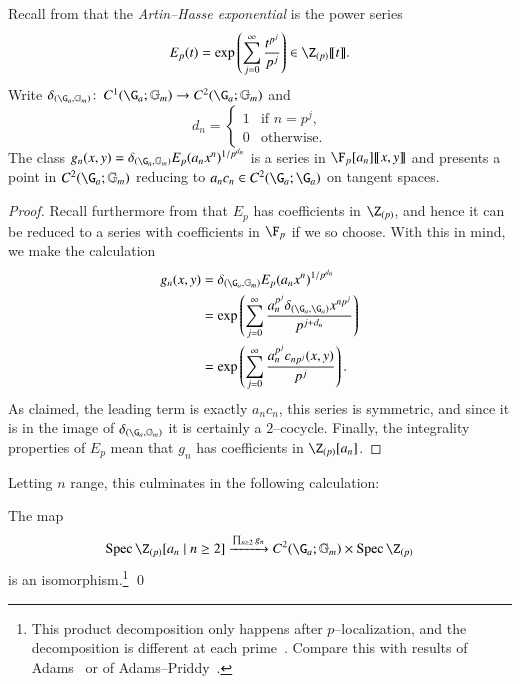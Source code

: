 \begin{lemma}
Recall from  that the \textit{Artin--Hasse exponential} is the power series \[E_p(t) = \exp\left( \sum_{j=0}^\infty \frac{t^{p^j}}{p^j} \right) \in \Z_{(p)}\ps{t}.\]  Write $\delta_{(\G_a, \Gm)}\co C^1(\G_a; \Gm) \to C^2(\G_a; \Gm)$ and \[d_n = \begin{cases} 1 & \text{if $n = p^j$}, \\ 0 & \text{otherwise}. \end{cases}\]  The class $g_n(x, y) = \delta_{(\G_a,\Gm)} E_p(a_n x^n)^{1/p^{d_n}}$ is a series in $\F_p[a_n]\ps{x,y}$ and presents a point in $C^2(\G_a; \Gm)$ reducing to $a_n c_n \in C^2(\G_a; \G_a)$ on tangent spaces.
\end{lemma}
\begin{proof}
Recall furthermore from  that $E_p$ has coefficients in $\Z_{(p)}$, and hence it can be reduced to a series with coefficients in $\F_p$ if we so choose.   With this in mind, we make the calculation
\begin{align*}
g_n(x, y) & = \delta_{(\G_a, \Gm)} E_p(a_n x^n)^{1/p^{d_n}} \\
& = \exp\left( \sum_{j=0}^\infty \frac{a_n^{p^j} \delta_{(\G_a, \G_a)} x^{np^j}}{p^{j + d_n}} \right) \\
& = \exp\left( \sum_{j=0}^\infty \frac{a_n^{p^j} c_{np^j}(x, y)}{p^j} \right).
\end{align*}
As claimed, the leading term is exactly $a_n c_n$, this series is symmetric, and since it is in the image of $\delta_{(\G_a, \Gm)}$ it is certainly a $2$--cocycle.  Finally, the integrality properties of $E_p$ mean that $g_n$ has coefficients in $\Z_{(p)}[a_n]$.
\end{proof}

Letting $n$ range, this culminates in the following calculation:

\begin{lemma}
The map \[\Spec \Z_{(p)}[a_n \mid n \ge 2] \xrightarrow{\prod_{n \ge 2} g_n} C^2(\G_a; \Gm) \times \Spec \Z_{(p)}\] is an isomorphism.\footnote{This product decomposition only happens after $p$--localization, and the decomposition is different at each prime~\cite[Section 3.3]{AHSTheoremOfTheCube}.  Compare this with results of Adams~\cite{AdamsPrimitiveElts} or of Adams--Priddy~\cite{AdamsPriddy}.} \qed
\end{lemma}

